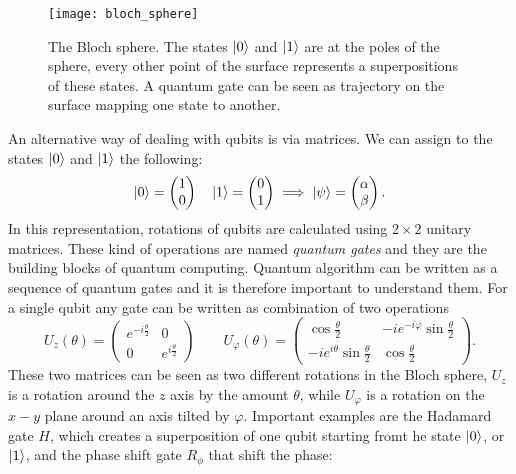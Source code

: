 \begin{figure}[H]
\centering
\texttt{[image: bloch\_sphere]}
\caption{The Bloch sphere. The states $\ket{0}$ and $\ket{1}$ are at the poles of the sphere, every other point of the surface represents a superpositions of these states. A quantum gate can be seen as trajectory on the surface mapping one state to another.}
\label{blochsphere}
\end{figure}

An alternative way of dealing with qubits is via matrices. We can assign to the states $\ket{0}$ and $\ket{1}$ the following:
\begin{equation}
\ket{0} = \begin{pmatrix}
 1 \\
 0
\end{pmatrix} \quad
\ket{1} = \begin{pmatrix}
 0 \\
 1
\end{pmatrix} \implies \ket{\psi} = \begin{pmatrix}
 \alpha \\
 \beta
\end{pmatrix}.
\end{equation}
In this representation, rotations of qubits are calculated using $2\times2$ unitary matrices. These kind of operations are named \emph{quantum gates} and they are the building blocks of quantum computing. Quantum algorithm can be written as a sequence of quantum gates and it is therefore important to understand them. For a single qubit any gate can be written as combination of two operations \cite{hempel}
\begin{equation}
\label{quantumgates}
U_z(\theta) =  \begin{pmatrix}
 e^{-i\frac{\theta}{2}} & 0 \\
 0 & e^{i\frac{\theta}{2}}
\end{pmatrix} \qquad U_\varphi(\theta) = \begin{pmatrix}
\cos\frac{\theta}{2} & -i e^{-i\varphi}\sin\frac{\theta}{2} \\
-ie^{i\theta}\sin\frac{\theta}{2} & \cos\frac{\theta}{2}
\end{pmatrix}.
\end{equation}
These two matrices can be seen as two different rotations in the Bloch sphere, $U_z$ is a rotation around the $z$ axis by the amount $\theta$, while $U_\varphi$ is a rotation on the $x-y$ plane around an axis tilted by $\varphi$. Important examples are the Hadamard gate $H$, which creates a superposition of one qubit starting fromt he state $\ket{0}$, or $\ket{1}$, and the phase shift gate $R_\phi$ that shift the phase:
